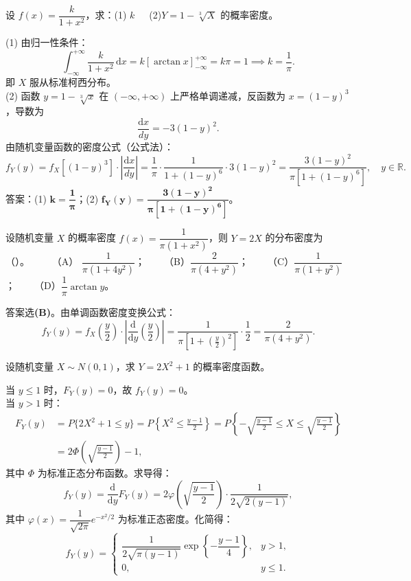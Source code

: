 \documentclass[lang=cn,11pt]{elegantbook}
\begin{document}
\begin{exercise}[柯西分布变换] \label{exer:2-49}
设 $f(x)=\dfrac{k}{1+x^2}$，求：(1) $k$~~~(2)$Y=1-\sqrt[3]{X}$ 的概率密度。
\end{exercise}
\begin{solution}
(1) 由归一性条件：
\[
\int_{-\infty}^{+\infty} \frac{k}{1+x^2}\,\mathrm{d}x = k\left[\arctan x\right]_{-\infty}^{+\infty} = k\pi = 1 \implies k = \frac{1}{\pi}.
\]
即 $X$ 服从标准柯西分布。\\
(2) 函数 $y=1-\sqrt[3]{x}$ 在 $(-\infty,+\infty)$ 上严格单调递减，反函数为 $x=(1-y)^3$，导数为
\[
\frac{\mathrm{d}x}{dy} = -3(1-y)^2.
\]
由随机变量函数的密度公式（公式法）：
\[
f_Y(y) = f_X[(1-y)^3] \cdot \left|\frac{\mathrm{d}x}{dy}\right| = \frac{1}{\pi}\cdot\frac{1}{1+(1-y)^6} \cdot 3(1-y)^2 = \frac{3(1-y)^2}{\pi\left[1+(1-y)^6\right]}, \quad y\in\mathbb{R}.
\]
答案：(1) $\boldsymbol{k=\dfrac{1}{\pi}}$；(2) $\boldsymbol{f_Y(y)=\dfrac{3(1-y)^2}{\pi[1+(1-y)^6]}}$。
\end{solution}

\begin{exercise}[柯西分布尺度变换]
设随机变量 $X$ 的概率密度 $f(x)=\dfrac{1}{\pi(1+x^2)}$，则 $Y=2X$ 的分布密度为（\quad）。~~~~
（A） $\dfrac{1}{\pi(1+4y^2)}$；~~~~（B）$\dfrac{2}{\pi(4+y^2)}$；~~~~（C）$\dfrac{1}{\pi(1+y^2)}$；~~~~（D）$\dfrac{1}{\pi}\arctan y$。
\end{exercise}
\begin{solution}
答案选\textbf{(B)}。由单调函数密度变换公式：
\[
f_Y(y) = f_X\left(\frac{y}{2}\right)\cdot\left|\frac{\mathrm{d}}{\mathrm{d}y}\left(\frac{y}{2}\right)\right| = \frac{1}{\pi\left[1+\left(\frac{y}{2}\right)^2\right]}\cdot\frac{1}{2} = \frac{2}{\pi(4+y^2)}.
\]
\end{solution}

\begin{exercise}[正态分布平方变换] 
设随机变量 $X\sim N(0,1)$，求 $Y=2X^2+1$ 的概率密度函数。
\end{exercise}
\begin{solution}
当 $y\leqslant1$ 时，$F_Y(y)=0$，故 $f_Y(y)=0$。\\
当 $y>1$ 时：
\[
\begin{aligned}
F_Y(y) &= P\{2X^2+1\leqslant y\} = P\left\{X^2\leqslant\frac{y-1}{2}\right\} = P\left\{-\sqrt{\frac{y-1}{2}}\leqslant X\leqslant\sqrt{\frac{y-1}{2}}\right\} \\
&= 2\Phi\left(\sqrt{\frac{y-1}{2}}\right)-1,
\end{aligned}
\]
其中 $\Phi$ 为标准正态分布函数。求导得：
\[
f_Y(y) = \frac{\mathrm{d}}{\mathrm{d}y}F_Y(y) = 2\varphi\left(\sqrt{\frac{y-1}{2}}\right)\cdot\frac{1}{2\sqrt{2(y-1)}},
\]
其中 $\varphi(x)=\dfrac{1}{\sqrt{2\pi}}e^{-x^2/2}$ 为标准正态密度。化简得：
\[
f_Y(y) =
\begin{cases}
\dfrac{1}{2\sqrt{\pi(y-1)}}\exp\left\{-\dfrac{y-1}{4}\right\}, & y>1, \\[8pt]
0, & y\leqslant1.
\end{cases}
\]
\end{solution}
\end{document}
